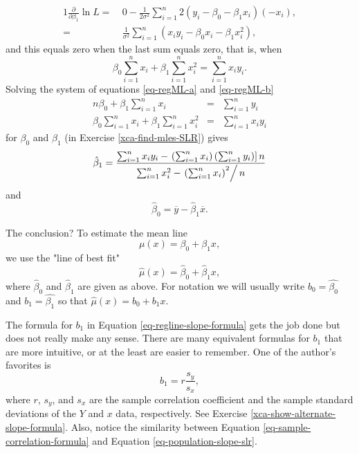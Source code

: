 \begin{alignat}{1}
\frac{\partial}{\partial \beta_{1}} \ln L = \ & 0 - \frac{1}{2\sigma^{2}} \sum_{i=1}^{n} 2 (y_{i} - \beta_{0} - \beta_{1} x_{i})(-x_{i}),\\ = & \frac{1}{\sigma^{2}}\sum_{i = 1}^{n}\left(x_{i} y_{i} - \beta_{0}x_{i} - \beta_{1}x_{i}^{2}\right),
\end{alignat}
and this equals zero when the last sum equals zero, that is, when
\begin{equation}
\label{eq-regML-b}
\beta_{0} \sum_{i = 1}^{n}x_{i} + \beta_{1} \sum_{i = 1}^{n}x_{i}^{2} = \sum_{i = 1}^{n}x_{i}y_{i}.
\end{equation}
Solving the system of equations \eqref{eq-regML-a} and \eqref{eq-regML-b}
\begin{eqnarray}
n\beta_{0} + \beta_{1}\sum_{i = 1}^{n}x_{i} & = & \sum_{i = 1}^{n}y_{i}\\
\beta_{0}\sum_{i = 1}^{n}x_{i}+\beta_{1}\sum_{i = 1}^{n}x_{i}^{2} & = & \sum_{i = 1}^{n}x_{i}y_{i}
\end{eqnarray}
for \( \beta_{0} \) and \( \beta_{1} \) (in Exercise \ref{xca-find-mles-SLR}) gives
\begin{equation}
\label{eq-regline-slope-formula}
\hat{\beta}_{1} = \frac{\sum_{i = 1}^{n}x_{i}y_{i} - \left.\left(\sum_{i = 1}^{n}x_{i}\right)\left(\sum_{i = 1}^{n}y_{i}\right)\right] n}{\sum_{i = 1}^{n}x_{i}^{2} - \left.\left(\sum_{i = 1}^{n}x_{i}\right)^{2}\right/ n}
\end{equation}
and
\begin{equation}
\hat{\beta}_{0} = \overline{y} - \hat{\beta}_{1}\overline{x}.
\end{equation}

The conclusion? To estimate the mean line 
\begin{equation}
\mu(x) = \beta_{0} + \beta_{1}x,
\end{equation}
we use the "line of best fit"
\begin{equation}
\hat{\mu}(x) = \hat{\beta}_{0} + \hat{\beta}_{1}x,
\end{equation}
where \(\hat{\beta}_{0}\) and \(\hat{\beta}_{1}\) are given as
above. For notation we will usually write \( b_{0} = \hat{\beta_{0}}
\) and \( b_{1}=\hat{\beta_{1}} \) so that \( \hat{\mu}(x) = b_{0} +
b_{1}x \).

\begin{rem}
The formula for \( b_{1} \) in Equation \eqref{eq-regline-slope-formula} gets
the job done but does not really make any sense. There are many
equivalent formulas for \( b_{1} \) that are more intuitive, or at the
least are easier to remember. One of the author's favorites is
\begin{equation}
\label{eq-sample-correlation-formula}
b_{1} = r\frac{s_{y}}{s_{x}},
\end{equation}
where \(r\), \( s_{y} \), and \( s_{x} \) are the sample correlation
coefficient and the sample standard deviations of the \(Y\) and \(x\)
data, respectively. See Exercise
\ref{xca-show-alternate-slope-formula}. Also, notice the similarity between
Equation \eqref{eq-sample-correlation-formula} and Equation
\eqref{eq-population-slope-slr}.
\end{rem}

